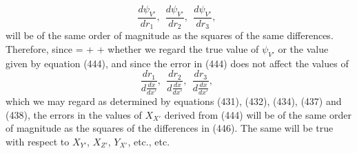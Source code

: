 \documentclass[12pt]{memoir}
\begin{document}
{$$\frac{d\psi_{V'}}{dr_1}, \ \ \frac{d\psi_{V'}}{dr_2}, \ \ \frac{d\psi_{V'}}{dr_3}, \ \ $$
will be of the same order of magnitude as the squares of the same differences. Therefore, since
\eqs {}=  +  +          \label{447}\eqe
whether we regard the true value of $\psi_{V'}$ or the value given by equation (444), and since the error in (444) does not affect the values of
$$ \frac{dr_1}{d\frac{dx}{dx'}},\ \ \frac{dr_2}{d\frac{dx}{dx'}},\ \ \frac{dr_3}{d\frac{dx}{dx'}},\ \ $$
which we may regard as determined by equations (431), (432), (434), (437) and (438), the errors in the values of $X_{X'}$ derived from (444) will be of the same order of magnitude as the squares of the differences in (446). The same will be true with respect to $X_{Y'}$, $X_{Z'}$, $Y_{X'}$, etc., etc.


}
\end{document}
